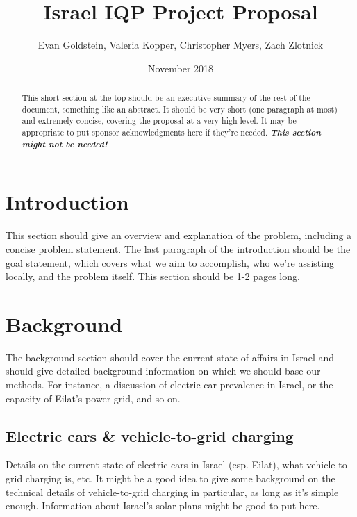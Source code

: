 \documentclass{article}
\title{Israel IQP Project Proposal}
\author{Evan Goldstein, Valeria Kopper, Christopher Myers, Zach Zlotnick}
\date{November 2018}
\begin{document}
\maketitle

\renewcommand\abstractname{Summary} %
\begin{abstract}
    \singlespacing
 This short section at the top should be an executive summary of the rest of the document, something like an abstract. It should be very short (one paragraph at most) and extremely concise, covering the proposal at a very high level. It may be appropriate to put sponsor acknowledgments here if they're needed. \textbf{\textit{This section might not be needed!}}
\end{abstract}

\tableofcontents
\newpage
{}


\section{Introduction}
This section should give an overview and explanation of the problem, including a concise problem statement. The last paragraph of the introduction should be the goal statement, which covers what we aim to accomplish, who we're assisting locally, and the problem itself. This section should be 1-2 pages long.

\newpage
\section{Background}
The background section should cover the current state of affairs in Israel and should give detailed background information on which we should base our methods. For instance, a discussion of electric car prevalence in Israel, or the capacity of Eilat's power grid, and so on.

\subsection{Electric cars \& vehicle-to-grid charging}
Details on the current state of electric cars in Israel (esp. Eilat), what vehicle-to-grid charging is, etc. It might be a good idea to give some background on the technical details of vehicle-to-grid charging in particular, as long as it's simple enough. Information about Israel's solar plans might be good to put here.
\end{document}

